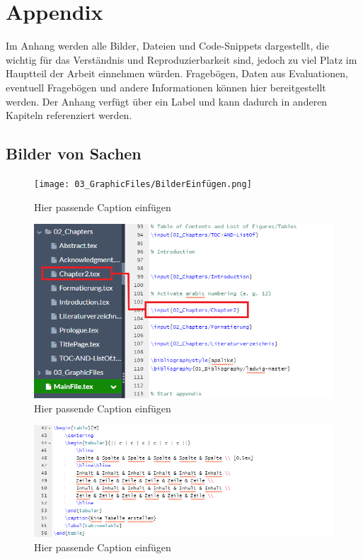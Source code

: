 \chapter{Appendix}\label{cha: appendixA}
Im Anhang werden alle Bilder, Dateien und Code-Snippets dargestellt, die wichtig für das Verständnis und Reproduzierbarkeit sind, jedoch zu viel Platz im Hauptteil der Arbeit einnehmen würden. Fragebögen, Daten aus Evaluationen, eventuell Fragebögen und andere Informationen können hier bereitgestellt werden. Der Anhang verfügt über ein Label und kann dadurch in anderen Kapiteln referenziert werden.

\section{Bilder von Sachen}
\begin{figure}[H]
	\centering  
	\texttt{[image: 03\_GraphicFiles/BilderEinfügen.png]}
	\caption{Hier passende Caption einfügen}
	\label{fig:picture01}
\end{figure}

\begin{figure}[H]
	\centering  
	\includegraphics[width=\textwidth]{03_GraphicFiles/MainFile.png}
	\caption{Hier passende Caption einfügen}
	\label{fig:picture02}
\end{figure}

\begin{figure}[H]
	\centering  
	\includegraphics[width=\textwidth]{03_GraphicFiles/TabellenErstellen.PNG}
	\caption{Hier passende Caption einfügen}
	\label{fig:picture03}
\end{figure}

